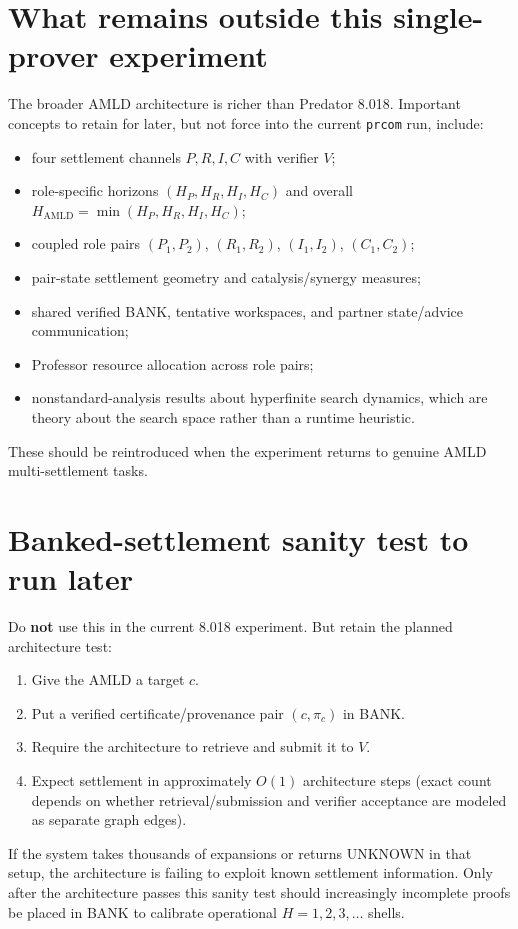 \documentclass[11pt]{article}
\newcommand{\code}[1]{\texttt{#1}}
\begin{document}
\section{What remains outside this single-prover experiment}

The broader AMLD architecture is richer than Predator 8.018. Important concepts to retain for later, but not force into the current \code{prcom} run, include:
\begin{itemize}
\item four settlement channels $P,R,I,C$ with verifier $V$;
\item role-specific horizons $(H_P,H_R,H_I,H_C)$ and overall $H_{\mathrm{AMLD}}=\min(H_P,H_R,H_I,H_C)$;
\item coupled role pairs $(P_1,P_2)$, $(R_1,R_2)$, $(I_1,I_2)$, $(C_1,C_2)$;
\item pair-state settlement geometry and catalysis/synergy measures;
\item shared verified BANK, tentative workspaces, and partner state/advice communication;
\item Professor resource allocation across role pairs;
\item nonstandard-analysis results about hyperfinite search dynamics, which are theory about the search space rather than a runtime heuristic.
\end{itemize}

These should be reintroduced when the experiment returns to genuine AMLD multi-settlement tasks.

\section{Banked-settlement sanity test to run later}

Do \textbf{not} use this in the current 8.018 experiment. But retain the planned architecture test:
\begin{enumerate}
\item Give the AMLD a target $c$.
\item Put a verified certificate/provenance pair $(c,\pi_c)$ in BANK.
\item Require the architecture to retrieve and submit it to $V$.
\item Expect settlement in approximately $O(1)$ architecture steps (exact count depends on whether retrieval/submission and verifier acceptance are modeled as separate graph edges).
\end{enumerate}
If the system takes thousands of expansions or returns UNKNOWN in that setup, the architecture is failing to exploit known settlement information. Only after the architecture passes this sanity test should increasingly incomplete proofs be placed in BANK to calibrate operational $H=1,2,3,\ldots$ shells.
\end{document}
